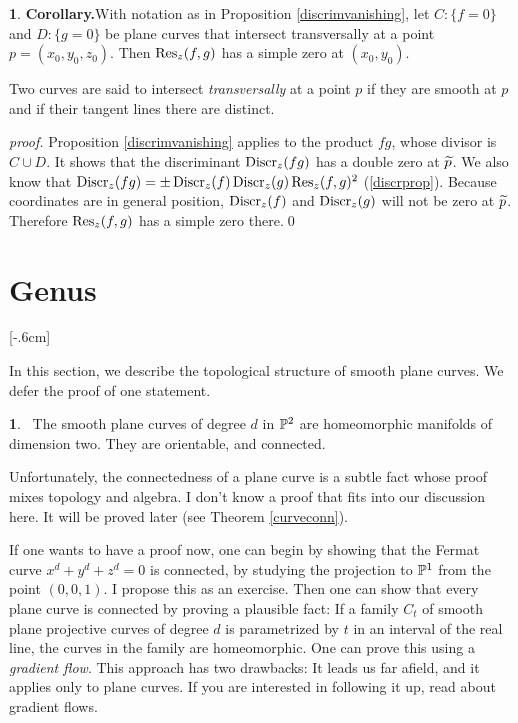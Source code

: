\documentclass[leqno]{book}
\newcommand\Marginnote[1]{\marginnote{\hspace{-12pt}\normalfont{#1}}}
\theoremstyle{definition}%
\numberwithin{equation}{section}
\theoremstyle{theorem} %
\newtheorem{corollary}[equation]{}
\newtheorem{theorem}[equation]{}
\renewenvironment{proof}{\no \emph{proof.}}{}
\begin{document}
\begin{corollary}{\bf Corollary.}\Marginnote{transres}\label{transres}
With notation as in Proposition \ref{discrimvanishing}, let $C:
\{f=0\}$ and $D:\{g=0\}$ be plane curves that intersect transversally
at a point $p = (x_0,y_0,z_0)$.  Then $\operatorname{Res}_z(f,g)$ has a simple zero
at $(x_0,y_0)$. \end{corollary}

\no
Two curves are said to intersect {\it transversally} at a point $p$ if
they are smooth at $p$ and if their tangent lines there are distinct.


\begin{proof} 
Proposition \ref{discrimvanishing} applies to the product $fg$, whose
divisor is $C\cup D$.  It shows that the discriminant $\operatorname{Discr}_z(fg)$
has a double zero at $\widetilde p$.  We also know that $\operatorname{Discr}_z(fg) = \pm
\operatorname{Discr}_z(f)\operatorname{Discr}_z(g)\operatorname{Res}_z(f,g)^2$ (\ref{discrprop}).  Because
coordinates are in general position, $\operatorname{Discr}_z(f)$ and $\operatorname{Discr}_z(g)$
will not be zero at $\widetilde p$.  Therefore $\operatorname{Res}_z(f,g)$ has a simple zero
there.\qed\end{proof}

 
\section{Genus}
\label{genus}\Marginnote{genus}[-.6cm] 

\msno In this section, we describe the topological structure of smooth
plane curves. We defer the proof of one statement.


\begin{theorem}{}
\Marginnote{curveshomeomorphic}\;\,
The smooth plane
curves of degree $d$ in $\mathbb{P}^2$ are homeomorphic manifolds of
dimension two.  They are orientable,  and connected.
\label{curveshomeomorphic}\end{theorem}

\msno Unfortunately, the connectedness of a plane curve is a subtle
fact whose proof mixes topology and algebra.  I don't know a proof
that fits into our discussion here.  It will be proved later (see Theorem
\ref{curveconn}).

If one wants to have a proof now, one can begin by showing that the
Fermat curve $x^d+y^d+z^d=0$ is connected, by studying the projection
to $\mathbb{P}^1$ from the point $(0,0,1)$.  I propose this as an exercise.
Then one can show that every plane curve is connected by proving a
plausible fact: If a family $C_t$ of smooth plane projective curves of
degree $d$ is parametrized by $t$ in an interval of the real line, the
curves in the family are homeomorphic.  One can prove this using a
{\it gradient flow}.  This approach has two drawbacks: It
leads us far afield, and it applies only to plane curves.  If you are
interested in following it up, read about gradient flows.
\end{document}
